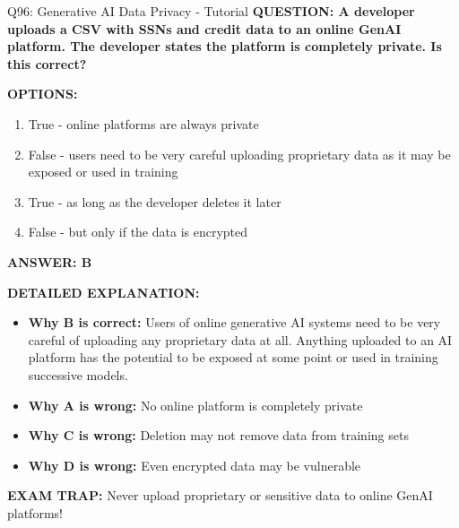 \documentclass[8pt]{beamer}
\begin{document}
	\begin{frame}{Q96: Generative AI Data Privacy - Tutorial}
		\fontsize{6.5}{7.5}\selectfont
		\textbf{QUESTION: A developer uploads a CSV with SSNs and credit data to an online GenAI platform. The developer states the platform is completely private. Is this correct?}
		
		\vspace{0.1cm}
		\textbf{OPTIONS:}
		\begin{enumerate}
			\item True - online platforms are always private
			\item False - users need to be very careful uploading proprietary data as it may be exposed or used in training
			\item True - as long as the developer deletes it later
			\item False - but only if the data is encrypted
		\end{enumerate}
		
		\vspace{0.1cm}
		\textcolor{myblue}{\textbf{ANSWER: B}}
		
		\vspace{0.1cm}
		\textbf{DETAILED EXPLANATION:}
		\begin{itemize}
			\item \textbf{Why B is correct:} Users of online generative AI systems need to be very careful of uploading any proprietary data at all. Anything uploaded to an AI platform has the potential to be exposed at some point or used in training successive models.
			\item \textbf{Why A is wrong:} No online platform is completely private
			\item \textbf{Why C is wrong:} Deletion may not remove data from training sets
			\item \textbf{Why D is wrong:} Even encrypted data may be vulnerable
		\end{itemize}
		
		\textcolor{myred}{\textbf{EXAM TRAP:}} Never upload \textcolor{myblue}{proprietary or sensitive data} to online GenAI platforms!
	\end{frame}
	
\end{document}
